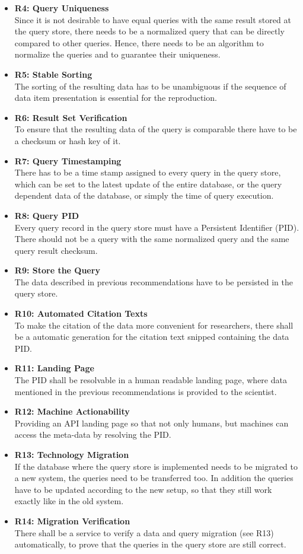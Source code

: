 \documentclass[draft,final]{vutinfth} %
\begin{document}
\begin{itemize}
\begin{itemize}
	\end{itemize}
	\item \textbf{R4: Query Uniqueness} \\
	Since it is not desirable to have equal queries with the same result stored at the query store, there needs to be a normalized query that can be directly compared to other queries. Hence, there needs to be an algorithm to normalize the queries and to guarantee their uniqueness.
	\item \textbf{R5: Stable Sorting} \\
	The sorting of the resulting data has to be unambiguous if the sequence of data item presentation is essential for the reproduction.
	\item \textbf{R6: Result Set Verification} \\
	To ensure that the resulting data of the query is comparable there have to be a checksum or hash key of it. 
	\item \textbf{R7: Query Timestamping} \\
	There has to be a time stamp assigned to every query in the query store, which can be set to the latest update of the entire database, or the query dependent data of the database, or simply the time of query execution.
	\item \textbf{R8: Query PID}\\
	Every query record in the query store must have a Persistent Identifier (PID). There should not be a query with the same normalized query and the same query result checksum. 
	\item \textbf{R9: Store the Query} \\
	The data described in previous recommendations have to be persisted in the query store.
	\item \textbf{R10: Automated Citation Texts} \\
	To make the citation of the data more convenient for researchers, there shall be a automatic generation for the citation text snipped containing the data PID.
	\item \textbf{R11: Landing Page} \\
	The PID shall be resolvable in a human readable landing page, where data mentioned in the previous recommendations is provided to the scientist.
	\item \textbf{R12: Machine Actionability} \\
	Providing an API landing page so that not only humans, but machines can access the meta-data by resolving the PID.
	\item \textbf{R13: Technology Migration} \\
	If the database where the query store is implemented needs to be migrated to a new system, the queries need to be transferred too. In addition the queries have to be updated according to the new setup, so that they still work exactly like in the old system.
	\item \textbf{R14: Migration Verification} \\
	There shall be a service to verify a data and query migration (see R13) automatically, to prove that the queries in the query store are still correct. 
\end{itemize}
\end{document}
